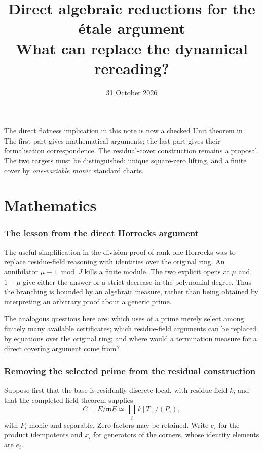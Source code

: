 \documentclass[11pt]{article}
\title{Direct algebraic reductions for the \'etale argument\\
\large What can replace the dynamical rereading?}
\author{}
\date{31 October 2026}
\newcommand{\m}{\mathfrak m}
\begin{document}
\maketitle

The direct flatness implication in this note is now a checked Unit
theorem in . The first part gives mathematical
arguments; the last part gives their formalisation correspondence.
The residual-cover construction remains a proposal. The two targets must be distinguished: unique square-zero
lifting, and a finite cover by \emph{one-variable monic} standard charts.

\part{Mathematics}

\section{The lesson from the direct Horrocks argument}

The useful simplification in the division proof of rank-one Horrocks
was to replace residue-field reasoning with identities over the original
ring. An annihilator $\mu\equiv1\bmod J$ kills a finite module. The two
explicit opens at $\mu$ and $1-\mu$ give either the answer or a strict
decrease in the polynomial degree. Thus the branching is bounded by an
algebraic measure, rather than being obtained by interpreting an arbitrary
proof about a generic prime.

The analogous questions here are: which uses of a prime merely select
among finitely many available certificates; which residue-field arguments
can be replaced by equations over the original ring; and where would a
termination measure for a direct covering argument come from?

\section{Removing the selected prime from the residual construction}

Suppose first that the base is residually discrete local, with residue
field $k$, and that the completed field theorem supplies
\[
       C=E/\m E\simeq \prod_i k[T]/(P_i),
\]
with $P_i$ monic and separable. Zero factors may be retained.
Write $e_i$ for the product idempotents and $x_i$ for generators of the
corners, whose identity elements are $e_i$.
\end{document}
